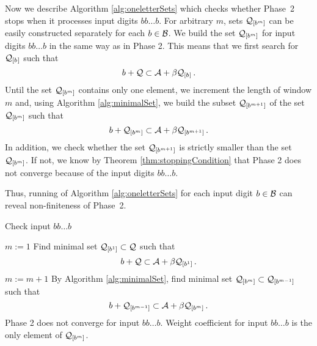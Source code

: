 

\begin{upravit}
 Now we describe Algorithm \ref{alg:oneletterSets} which checks whether Phase~2 stops when it processes input digits $bb\dots b$.
For arbitrary $m$, sets $\mathcal{Q}_{[b^{m}]}$  can be easily constructed separately for each $b\in\mathcal{B}$. We build the set $\mathcal{Q}_{[b^{m}]}$ for input digits $bb\dots b$ in the same way as in Phase 2. This means that we first search for $\mathcal{Q}_{[b^{}]}$ such that 
$$
b + \mathcal{Q} \subset \mathcal{A} + \beta \mathcal{Q}_{[b^{}]}\,.
$$
Until the set $\mathcal{Q}_{[b^{m}]}$ contains only one element, we increment the length of  window $m$ and, using Algorithm \ref{alg:minimalSet}, we build the subset $\mathcal{Q}_{[b^{m+1}]}$ of the set $\mathcal{Q}_{[b^{m}]}$ such that
$$
b + \mathcal{Q}_{[b^{m}]} \subset \mathcal{A} + \beta \mathcal{Q}_{[b^{m+1}]}\,.
$$
In addition, we check whether the set $\mathcal{Q}_{[b^{m+1}]}$ is strictly smaller than the set $\mathcal{Q}_{[b^{m}]}$. If not, we know by Theorem \ref{thm:stoppingCondition} that Phase 2 does not converge because of the input digits $bb\dots b$.

Thus, running of Algorithm \ref{alg:oneletterSets} for each input digit $b\in\mathcal{B}$ can reveal non-finiteness of Phase~2.

\begin{algorithm}
  \caption{Check input $bb\dots b$}
    \label{alg:oneletterSets}
  \begin{algorithmic}[1]
    \STATE $m:=1$
    \STATE Find minimal set $\mathcal{Q}_{[b^{1}]} \subset \mathcal{Q}$ such that
      $$
      b + \mathcal{Q} \subset \mathcal{A} + \beta \mathcal{Q}_{[b^{1}]}\,.
      $$
      \vspace{-20pt}
        \STATE $m:= m +1$
        \STATE By Algorithm \ref{alg:minimalSet}, find minimal set $\mathcal{Q}_{[b^{m}]} \subset \mathcal{Q}_{[b^{m-1}]}$ such that
          $$
          b + \mathcal{Q}_{[b^{m-1}]} \subset \mathcal{A} + \beta \mathcal{Q}_{[b^{m}]}\,.
          $$  
          \vspace{-20pt}
            \RETURN Phase 2 does not converge for input $bb\dots b$.
        \ENDIF
    \ENDWHILE  
    \RETURN Weight coefficient for input $bb\dots b$ is the only element of $\mathcal{Q}_{[b^{m}]}$.
  \end{algorithmic}
\end{algorithm}

\end{upravit}